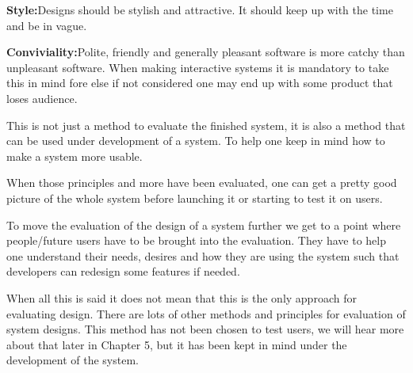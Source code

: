 \textbf{Style:}Designs should be stylish and attractive. It should keep up with the time and be in vague.

\textbf{Conviviality:}Polite, friendly and generally pleasant software is more catchy than unpleasant software. When making interactive systems it is mandatory to take this in mind fore else if not considered one may end up with some product that loses audience.

This is not just a method to evaluate the finished system, it is also a method that can be used under development of a system. To help one keep in mind how to make a system more usable.

When those principles and more have been evaluated, one can get a pretty good picture of the whole system before launching it or starting to test it on users.

To move the evaluation of the design of a system further we get to a point where people/future users have to be brought into the evaluation. They have to help one understand their needs, desires and how they are using the system such that developers can redesign some features if needed.

When all this is said it does not mean that this is the only approach for evaluating design. There are lots of other methods and principles for evaluation of system designs. This method has not been chosen to test users, we will hear more about that later in Chapter 5, but it has been kept in mind under the development of the system.\cite{Benyon10} 


